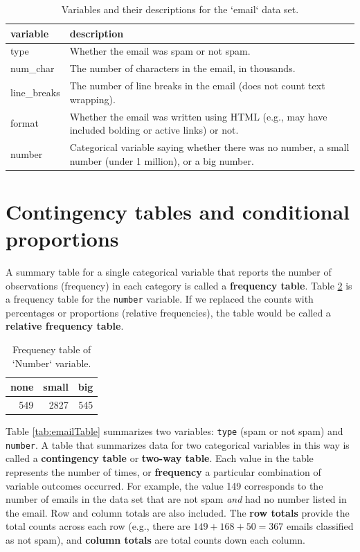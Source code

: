 \documentclass[
  10pt,
  openany]{book}
\theoremstyle{definition}
\theoremstyle{definition}
\theoremstyle{definition}
\theoremstyle{definition}
\theoremstyle{remark}
\begin{document}
\begin{table}

\caption{\label{tab:emailVariables}Variables and their descriptions for the `email` data set.}
\centering
\begin{tabular}[t]{l|l}
\hline
variable & description\\
\hline
type & Whether the email was spam or not spam.\\
\hline
num\_char & The number of characters in the email, in thousands.\\
\hline
line\_breaks & The number of line breaks in the email (does not count text wrapping).\\
\hline
format & Whether the email was written using HTML (e.g., may have included bolding or active links) or not.\\
\hline
number & Categorical variable saying whether there was no number, a small number (under 1 million), or a big number.\\
\hline
\end{tabular}
\end{table}

\section{Contingency tables and conditional proportions}\label{contingency-tables-and-conditional-proportions}

A summary table for a single categorical variable that reports the number of observations (frequency) in each category is called a \textbf{frequency table}. Table
\ref{tab:emailTableNumber} is a frequency table for the \texttt{number} variable.
If we replaced the counts with percentages or proportions (relative frequencies),
the table would be called a \textbf{relative frequency table}.

\begin{table}

\caption{\label{tab:emailTableNumber}Frequency table of `Number` variable.}
\centering
\begin{tabular}[t]{r|r|r}
\hline
none & small & big\\
\hline
549 & 2827 & 545\\
\hline
\end{tabular}
\end{table}

Table \ref{tab:emailTable} summarizes two variables:
\texttt{type} (spam or not spam) and \texttt{number}. A table that summarizes data for two categorical variables
in this way is called a \textbf{contingency table} or \textbf{two-way table}.
Each value in the table represents the number of times, or \textbf{frequency}
a particular combination of variable outcomes occurred.
For example, the value 149 corresponds to the number of emails
in the data set that are not spam \emph{and} had no number listed in the email.
Row and column totals are also included.
The \textbf{row totals} provide the total counts across each row
(e.g., there are \(149 + 168 + 50 = 367\) emails classified as not spam), and \textbf{column totals} are total
counts down each column.
\end{document}
